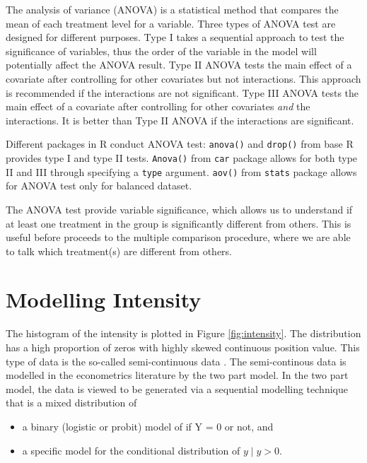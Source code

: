 \documentclass{monashthesis}
\begin{document}
The analysis of variance (ANOVA) \autocites{faraway2016extending}{gelman2006data} is a statistical method that compares the mean of each treatment level for a variable. Three types of ANOVA test are designed for different purposes. Type I takes a sequential approach to test the significance of variables, thus the order of the variable in the model will potentially affect the ANOVA result. Type II ANOVA tests the main effect of a covariate after controlling for other covariates but not interactions. This approach is recommended if the interactions are not significant. Type III ANOVA tests the main effect of a covariate after controlling for other covariates \emph{and} the interactions. It is better than Type II ANOVA if the interactions are significant.

Different packages in R conduct ANOVA test: \texttt{anova()} and \texttt{drop()} from base R provides type I and type II tests. \texttt{Anova()} from \texttt{car} package allows for both type II and III through specifying a \texttt{type} argument. \texttt{aov()} from \texttt{stats} package allows for ANOVA test only for balanced dataset.

The ANOVA test provide variable significance, which allows us to understand if at least one treatment in the group is significantly different from others. This is useful before proceeds to the multiple comparison procedure, where we are able to talk which treatment(s) are different from others.

\newpage

\hypertarget{modelling-intensity}{%
\section{Modelling Intensity}\label{modelling-intensity}}

The histogram of the intensity is plotted in Figure \ref{fig:intensity}. The distribution has a high proportion of zeros with highly skewed continuous position value. This type of data is the so-called semi-continuous data \autocites{Neelon2019}{twopart2010}. The semi-continous data is modelled in the econometrics literature by the two part model\autocites{cragg1971some}{manning1981two}. In the two part model, the data is viewed to be generated via a sequential modelling technique that is a mixed distribution of

\begin{itemize}
\tightlist
\item
  a binary (logistic or probit) model of if Y = 0 or not, and
\item
  a specific model for the conditional distribution of \(y \mid y > 0\).
\end{itemize}
\end{document}
